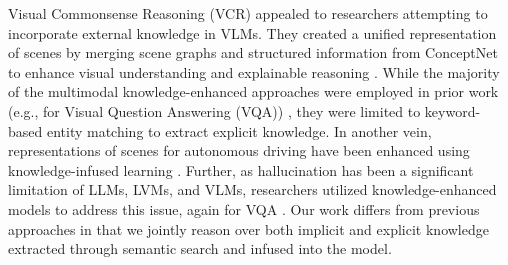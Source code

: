 Visual Commonsense Reasoning (VCR) 
appealed to researchers attempting to incorporate external knowledge in VLMs.  
They created a unified representation of scenes by merging scene graphs and structured information from ConceptNet to enhance visual understanding and explainable reasoning \cite{Zareian2020-vw,Pan2022-jd}. 
While the majority of the multimodal knowledge-enhanced 
approaches were employed in prior work (e.g., for Visual Question Answering (VQA)) \cite{Garderes2020-gx,Marino2021-sn,Wu2022-lj}, they were limited to keyword-based entity matching to extract explicit knowledge. In another vein, representations of scenes for autonomous driving have been enhanced using knowledge-infused learning \cite{wickramarachchi2022knowledge,wickramarachchi2021knowledge}.
Further, as hallucination has been a significant limitation of LLMs, LVMs, and VLMs, researchers utilized knowledge-enhanced models to address this issue, again for VQA \cite{Chen2023-mf}. Our work differs from previous approaches in that we jointly reason over both implicit and explicit knowledge extracted through semantic search and infused into the model. 

\vspace{-1em}
